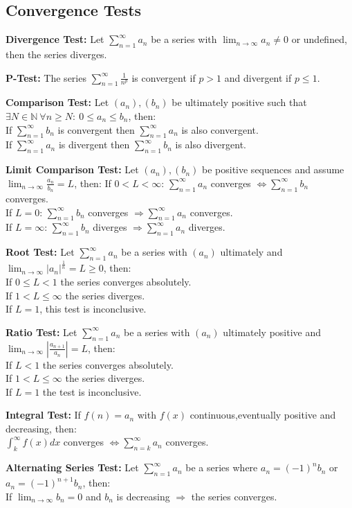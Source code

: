 \documentclass[8pt,a4paper]{extarticle}     %
\theoremstyle{definition}
\theoremstyle{definition}
\theoremstyle{definition}
\newcommand{\N}{\mathbb{N}}
\begin{document}
\begin{multicols}{4}
\subsection{Convergence Tests}
\begin{eqlist}
	\item \textbf{Divergence Test:} Let $\sum_{n=1}^\infty a_n$ be a series with $\lim_{n\to\infty} a_n \neq 0$ or undefined, then the series diverges.
	\item \textbf{P-Test: } The series $\sum_{n=1}^\infty \frac{1}{n^p}$ is convergent if $p>1$ and divergent if $p\leq1$. 
	\item \textbf{Comparison Test:} Let $(a_n), (b_n)$ be ultimately positive such that $\exists N\in\N \ \forall n \geq N: \ 0\leq a_n \leq b_n$, then: \\ 
	If $\sum_{n=1}^\infty b_n$ is convergent then $\sum_{n=1}^\infty a_n$ is also convergent. \\
	If $\sum_{n=1}^\infty a_n$ is divergent then $\sum_{n=1}^\infty b_n$ is also divergent. 
	\item \textbf{Limit Comparison Test:} Let $(a_n), (b_n)$ be positive sequences and assume $\lim_{n\to\infty} \frac{a_n}{b_n} = L$, then: 
	If $0<L<\infty$: $\sum_{n=1}^\infty a_n$ converges $\Leftrightarrow \sum_{n=1}^\infty b_n$ converges. \\ 
	If $L=0$: $\sum_{n=1}^\infty b_n$ converges $\Rightarrow \sum_{n=1}^\infty a_n$ converges.\\
	If $L=\infty$: $\sum_{n=1}^\infty b_n$ diverges $\Rightarrow \sum_{n=1}^\infty a_n$ diverges.
	\item \textbf{Root Test:} Let $\sum_{n=1}^\infty a_n$ be a series with $(a_n)$ ultimately and $\lim_{n\to\infty} |a_n|^{\frac{1}{n}} = L \geq 0$, then: \\ 
	If $0\leq L<1$ the series converges absolutely.\\
	If $1<L\leq\infty$ the series diverges. \\ 
	If $L=1$, this test is inconclusive. 
	\item \textbf{Ratio Test:} Let $\sum_{n=1}^\infty a_n$ be a series with $(a_n)$ ultimately positive and $\lim_{n\to\infty}\left|\frac{a_{n+1}}{a_n}\right| = L$, then: \\
	If $L<1$ the series converges absolutely.\\
	If $1<L\leq\infty$ the series diverges. \\
	If $L=1$ the test is inconclusive. 
	\item \textbf{Integral Test:} If $f(n) = a_n$ with $f(x)$ continuous,eventually positive and decreasing, then: \\ 
	$\int_k^\infty f(x)dx$ converges $\Leftrightarrow \sum_{n=k}^\infty a_n$ converges. 
	\item \textbf{Alternating Series Test:} Let $\sum_{n=1}^\infty a_n$ be a series where $a_n = (-1)^nb_n$ or $a_n = (-1)^{n+1}b_n$, then: \\
	If $\lim_{n\to\infty}b_n=0$ and $b_n$ is decreasing $\Rightarrow$ the series converges. 
\end{eqlist}

\end{multicols}
\end{document}

